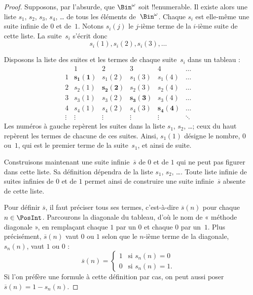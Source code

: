 \documentclass[11pt,a4paper,openany]{memoir}
\begin{document}
\begin{proof}
Supposons, par l’absurde, que $\Bin^\omega$ soit !!{enumerable}.
Il existe alors une liste $s_{1}$, $s_{2}$, $s_{3}$, $s_{4}$, \dots{}
de tous les éléments de~$\Bin^\omega$. Chaque $s_i$ est elle-même
une suite infinie de $0$ et de~$1$. Notons $s_i(j)$ le $j$-ième terme
de la $i$-ième suite de cette liste. La suite~$s_i$ s’écrit donc
\[
s_i(1), s_i(2), s_i(3), \dots
\]

Disposons la liste des suites et les termes de chaque suite~$s_i$
dans un tableau :
\[
\begin{array}{c|c|c|c|c|c}
& 1 & 2 & 3 & 4 & \dots \\\hline
1 & \mathbf{s_{1}(1)} & s_{1}(2) & s_{1}(3) & s_1(4) & \dots \\\hline
2 & s_{2}(1)& \mathbf{s_{2}(2)} & s_2(3) & s_2(4) & \dots \\\hline
3 & s_{3}(1)& s_{3}(2) & \mathbf{s_3(3)} & s_3(4) & \dots \\\hline
4 & s_{4}(1)& s_{4}(2) & s_4(3) & \mathbf{s_4(4)} & \dots \\\hline
\vdots & \vdots & \vdots & \vdots & \vdots & \mathbf{\ddots}
\end{array}
\]
Les numéros à gauche repèrent les suites dans la liste $s_1$, $s_2$,
\dots ; ceux du haut repèrent les termes de chacune de ces suites.
Ainsi, $s_{1}(1)$ désigne le nombre, $0$ ou~$1$, qui est le premier
terme de la suite~$s_{1}$, et ainsi de suite.

Construisons maintenant une suite infinie~$\overline{s}$ de $0$
et de $1$ qui ne peut pas figurer dans cette liste. Sa définition
dépendra de la liste $s_1$, $s_2$, \dots. Toute liste infinie de
suites infinies de $0$ et de $1$ permet ainsi de construire une
suite infinie~$\overline{s}$ absente de cette liste.

Pour définir $\overline{s}$, il faut préciser tous ses termes,
c’est-à-dire $\overline{s}(n)$ pour chaque $n \in \PosInt$.
Parcourons la diagonale du tableau, d’où le nom de « méthode
diagonale », en remplaçant chaque $1$ par un $0$ et chaque $0$
par un~$1$. Plus précisément, $\overline{s}(n)$ vaut $0$ ou $1$
selon que le $n$-ième terme de la diagonale, $s_n(n)$, vaut $1$ ou $0$ :
\[
\overline{s}(n) =
\begin{cases}
1 & \text{si $s_{n}(n) = 0$}\\
0 & \text{si $s_{n}(n) = 1$}.
\end{cases}
\]
Si l’on préfère une formule à cette définition par cas, on peut
aussi poser $\overline{s}(n) = 1 - s_n(n)$.


\end{proof}
\end{document}
